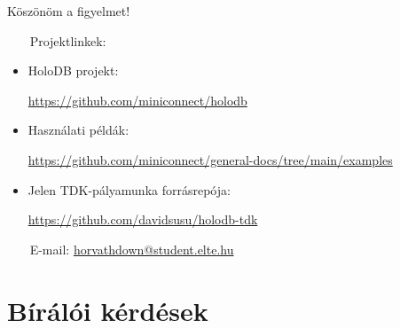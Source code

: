 \documentclass[
    aspectratio=169,
]{beamer}
\begin{document}
\begin{frame}
    \vspace{1em}
    
    \centering
    
    { \Huge Köszönöm a figyelmet! }
    
    \vspace{3em}
    
    \begin{flushleft}
        \normalsize
        
        ~~~
        {\color{beamer@blendedblue}Projektlinkek:}
        
        \vspace{0.5em}
        
        \footnotesize
        
        \begin{itemize}
            \item HoloDB projekt: \par
                    \url{https://github.com/miniconnect/holodb}
            \item Használati példák: \par
                    \url{https://github.com/miniconnect/general-docs/tree/main/examples}
            \item Jelen TDK-pályamunka forrásrepója: \par
                    \url{https://github.com/davidsusu/holodb-tdk}
        \end{itemize}
        
        \vspace{1.5em}
        
        \normalsize
        
        ~~~
        { \color{beamer@blendedblue} E-mail: }
        \href{mailto:horvathdown@student.elte.hu}{horvathdown@student.elte.hu}
        \end{flushleft}
\end{frame}

\appendix
\begingroup
{}

\section{Bírálói kérdések}
\def\sectionshorttitle{Kérdések}

\begin{frame}[noframenumbering]
    ~~~
\end{frame}
\end{document}

